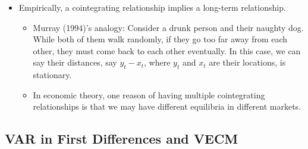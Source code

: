\documentclass[notitlepage]{article}
\begin{document}
\begin{itemize}
    \item Empirically, a cointegrating relationship implies a long-term relationship.
    \begin{itemize}
        \item Murray (1994)'s analogy: Consider a drunk person and their naughty dog. While both of them walk randomly, if they go too far away from each other, they must come back to each other eventually. In this case, we can say their distances, say \(y_t-x_t\), where \(y_t\) and \(x_t\) are their locations, is stationary.
        \item In economic theory, one reason of having multiple cointegrating relationships is that we may have different equilibria in different markets.
    \end{itemize}
    
\end{itemize}

\subsection{VAR in First Differences and VECM}
\end{document}
